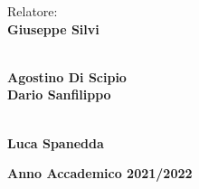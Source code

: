 \begin{multicols}{2}
\noindent \large{Relatore:} \\
\large{\textbf{Giuseppe Silvi}} \\
\vspace{0.1cm}

 \\
\large{\textbf{Agostino Di Scipio}} \\
\large{\textbf{Dario Sanfilippo}} \\
\vspace{0.1cm}

\columnbreak

 \\
\large{\textbf{Luca Spanedda}} \\
\end{multicols}

\vfill

\begin{center}
    \large{\textbf{Anno Accademico 2021/2022}}
\end{center}